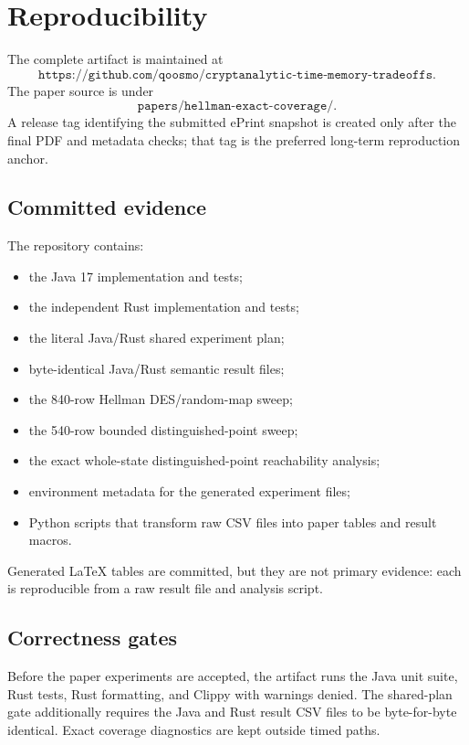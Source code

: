 \section{Reproducibility}
\label{sec:reproducibility}

The complete artifact is maintained at
\[
\texttt{https://github.com/qoosmo/cryptanalytic-time-memory-tradeoffs}.
\]
The paper source is under
\[
\texttt{papers/hellman-exact-coverage/}.
\]
A release tag identifying the submitted ePrint snapshot is created only after
the final PDF and metadata checks; that tag is the preferred long-term
reproduction anchor.

\subsection{Committed evidence}

The repository contains:
\begin{itemize}
  \item the Java 17 implementation and tests;
  \item the independent Rust implementation and tests;
  \item the literal Java/Rust shared experiment plan;
  \item byte-identical Java/Rust semantic result files;
  \item the 840-row Hellman DES/random-map sweep;
  \item the 540-row bounded distinguished-point sweep;
  \item the exact whole-state distinguished-point reachability analysis;
  \item environment metadata for the generated experiment files;
  \item Python scripts that transform raw CSV files into paper tables and
        result macros.
\end{itemize}

Generated LaTeX tables are committed, but they are not primary evidence: each
is reproducible from a raw result file and analysis script.

\subsection{Correctness gates}

Before the paper experiments are accepted, the artifact runs the Java unit
suite, Rust tests, Rust formatting, and Clippy with warnings denied. The
shared-plan gate additionally requires the Java and Rust result CSV files to be
byte-for-byte identical. Exact coverage diagnostics are kept outside timed
paths.


